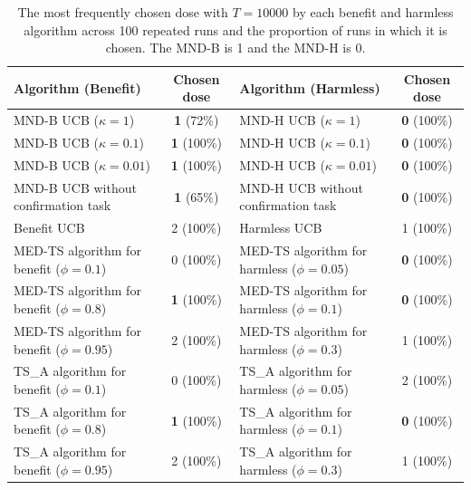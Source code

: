 \begin{table}[tb]
\centering
\caption{The most frequently chosen dose with $T=10000$ by each benefit and harmless algorithm across 100 repeated runs and the proportion of runs in which it is chosen. The MND-B is 1 and the MND-H is 0.}
\label{tab:4}
\small
\begin{tabular}{lc|lc}
\hline
Algorithm (Benefit) & Chosen dose & Algorithm (Harmless) & Chosen dose \\
\hline
MND-B UCB ($\kappa=1$) & \textbf{1} (72\%) & MND-H UCB ($\kappa=1$) & \textbf{0} (100\%) \\
MND-B UCB ($\kappa=0.1$) & \textbf{1} (100\%) & MND-H UCB ($\kappa=0.1$) & \textbf{0} (100\%) \\
MND-B UCB ($\kappa=0.01$) & \textbf{1} (100\%) & MND-H UCB ($\kappa=0.01$) & \textbf{0} (100\%) \\
\hline
MND-B UCB without confirmation task & \textbf{1} (65\%) & MND-H UCB without confirmation task & \textbf{0} (100\%) \\
Benefit UCB & 2 (100\%) & Harmless UCB & 1 (100\%) \\
MED-TS algorithm for benefit ($\phi=0.1$) & 0 (100\%) & MED-TS algorithm for harmless ($\phi=0.05$) & \textbf{0} (100\%) \\
MED-TS algorithm for benefit ($\phi=0.8$) & \textbf{1} (100\%) & MED-TS algorithm for harmless ($\phi=0.1$) & \textbf{0} (100\%) \\
MED-TS algorithm for benefit ($\phi=0.95$) & 2 (100\%) & MED-TS algorithm for harmless ($\phi=0.3$) & 1 (100\%) \\
TS\_A algorithm for benefit ($\phi=0.1$) & 0 (100\%) & TS\_A algorithm for harmless ($\phi=0.05$) & 2 (100\%) \\
TS\_A algorithm for benefit ($\phi=0.8$) & \textbf{1} (100\%) & TS\_A algorithm for harmless ($\phi=0.1$) & \textbf{0} (100\%) \\
TS\_A algorithm for benefit ($\phi=0.95$) & 2 (100\%) & TS\_A algorithm for harmless ($\phi=0.3$) & 1 (100\%) \\
\hline
\end{tabular}
\end{table}
